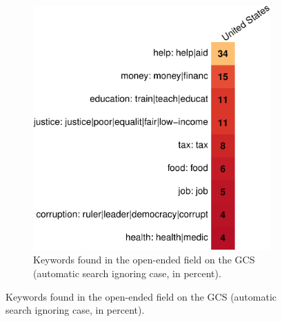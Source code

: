 \begin{figure}[h!]
\begin{subfigure}{.34\textwidth}
    \end{subfigure}
    \hspace{.02\textwidth}
    \begin{subfigure}{.64\textwidth}
        \cprotect\caption{Keywords found in the open-ended field on the GCS (automatic search ignoring case, in percent).}
        \includegraphics[width=\textwidth]{../figures/country_comparison/poverty_field_contains_positive.pdf}    
    \end{subfigure}
    \end{figure}


